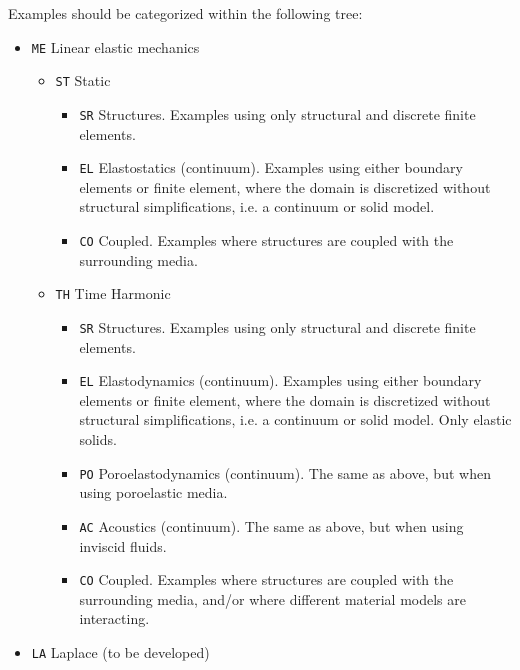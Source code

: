 \documentclass{article}
\begin{document}
Examples should be categorized within the following tree:
\begin{itemize}
    \item \texttt{ME} Linear elastic mechanics
    \begin{itemize}
        \item \texttt{ST} Static
        \begin{itemize}
            \item \texttt{SR} Structures. Examples using only structural and discrete finite elements.
            \item \texttt{EL} Elastostatics (continuum). Examples using either boundary elements or finite element, where the domain is discretized without structural simplifications, i.e. a continuum or solid model.
            \item \texttt{CO} Coupled. Examples where structures are coupled with the surrounding media.
        \end{itemize}
        \item \texttt{TH} Time Harmonic
        \begin{itemize}
            \item \texttt{SR} Structures. Examples using only structural and discrete finite elements.
            \item \texttt{EL} Elastodynamics (continuum). Examples using either boundary elements or finite element, where the domain is discretized without structural simplifications, i.e. a continuum or solid model. Only elastic solids.
            \item \texttt{PO} Poroelastodynamics (continuum). The same as above, but when using poroelastic media.
            \item \texttt{AC} Acoustics (continuum). The same as above, but when using inviscid fluids.
            \item \texttt{CO} Coupled. Examples where structures are coupled with the surrounding media, and/or where different material models are interacting.
        \end{itemize}        
    \end{itemize}
    \item \texttt{LA} Laplace (to be developed)
\end{itemize}
\end{document}
